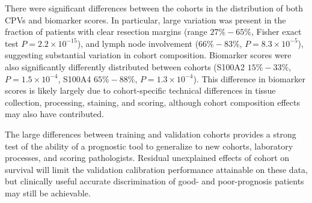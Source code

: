 \documentclass[dissertation.tex]{subfiles}
\begin{document}
There were significant differences between the cohorts in the distribution of both \glspl{CPV} and biomarker scores.  In particular, large variation was present in the fraction of patients with clear resection margins (range $27\%-65\%$, Fisher exact test $P = 2.2 \times 10^{-15}$), and lymph node involvement ($66\%-83\%$, $P = 8.3 \times 10^{-5}$), suggesting substantial variation in cohort composition.  Biomarker scores were also significantly differently distributed between cohorts (S100A2 $15\%-33\%$, $P = 1.5 \times 10^{-4}$, S100A4 $65\%-88\%$, $P = 1.3 \times 10^{-4}$).  This difference in biomarker scores is likely largely due to cohort-specific technical differences in tissue collection, processing, staining, and scoring, although cohort composition effects may also have contributed.  

The large differences between training and validation cohorts provides a strong test of the ability of a prognostic tool to generalize to new cohorts, laboratory processes, and scoring pathologists.  Residual unexplained effects of cohort on survival will limit the validation calibration performance attainable on these data, but clinically useful accurate discrimination of good- and poor-prognosis patients may still be achievable.
\end{document}

